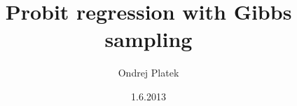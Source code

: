 \documentclass[12pt,a4paper]{report}
\title{Probit regression with Gibbs sampling}
\date{1.6.2013}
\author{Ondrej Platek}
\begin{document}
\maketitle
\pagestyle{plain}
\setcounter{page}{1}

\theoremstyle{plain}
\newtheorem{thm}{Theorem}[chapter] %

\theoremstyle{definition}
\newtheorem{defn}[thm]{Definition} %
\newtheorem{exmp}[thm]{Example} %
\newcommand{\norm}{\ensuremath{\:\mathcal{N}}}
\newcommand{\unity}{\ensuremath{\mathbf{I}}}
\newcommand{\Yh}{\ensuremath{\overset{\sim}{Y}}}
\newcommand{\yh}{\ensuremath{\overset{\sim}{y_i}}}
\newcommand{\yhs}{\ensuremath{\overset{\sim}{y_i^*}}}
\newcommand{\Yhs}{\ensuremath{\overset{\sim}{Y^*}}}
 
\end{document}
